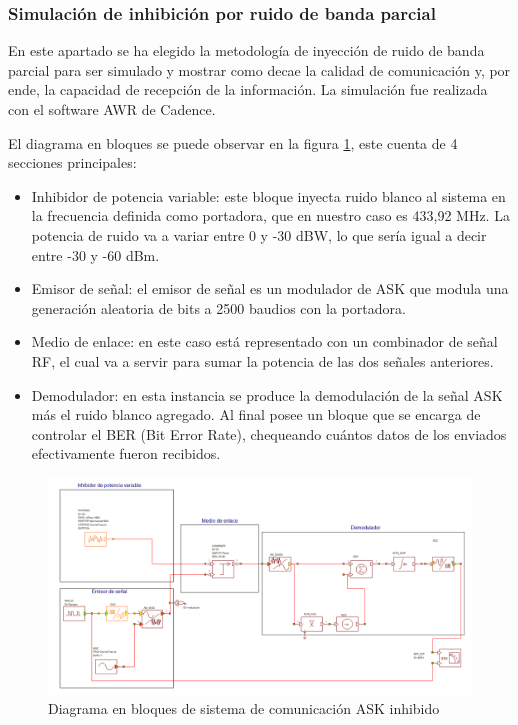 \subsubsection{Simulación de inhibición por ruido de banda parcial}

En este apartado se ha elegido la metodología de inyección de ruido de banda parcial para ser simulado y mostrar como decae la calidad de 
comunicación y, por ende, la capacidad de recepción de la información. La simulación fue realizada con el software AWR de Cadence.\par
El diagrama en bloques se puede observar en la figura \ref{bloques_inh}, este cuenta de 4 secciones principales:

\begin{itemize}
    \item Inhibidor de potencia variable: este bloque inyecta ruido blanco al sistema en la frecuencia definida como portadora, que en nuestro 
    caso es 433,92 MHz. La potencia de ruido va a variar entre 0 y -30 dBW, lo que sería igual a decir entre -30 y -60 dBm. 
    \item Emisor de señal: el emisor de señal es un modulador de ASK que modula una generación aleatoria de bits a 2500 baudios con la portadora.
    \item Medio de enlace: en este caso está representado con un combinador de señal RF, el cual va a servir para sumar la potencia de las dos
    señales anteriores.
    \item Demodulador: en esta instancia se produce la demodulación de la señal ASK más el ruido blanco agregado. Al final posee un bloque que
    se encarga de controlar el BER (Bit Error Rate), chequeando cuántos datos de los enviados efectivamente fueron recibidos. 

\end{itemize}

\begin{figure}[htb]
	\centering
	\includegraphics[scale=0.37]{images/bloques_inh.png}
    \caption{Diagrama en bloques de sistema de comunicación ASK inhibido}
	\label{bloques_inh}
\end{figure}

